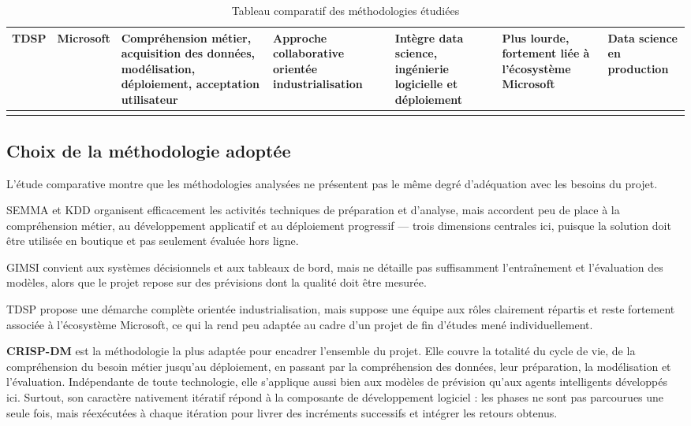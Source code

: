 \begin{longtable}{|P{1.45cm}|P{1.80cm}|P{2.45cm}|P{2.60cm}|P{2.00cm}|P{1.85cm}|P{1.70cm}|}
\hline

\textbf{TDSP} &
Microsoft &
Compréhension métier, acquisition des données, modélisation, déploiement, acceptation utilisateur &
Approche collaborative orientée industrialisation &
Intègre data science, ingénierie logicielle et déploiement &
Plus lourde, fortement liée à l'écosystème Microsoft &
Data science en production \\

\hline

\caption{Tableau comparatif des méthodologies étudiées}
\label{tab:comparaison-methodologies-chap1}

\end{longtable}
\endgroup

\subsection{Choix de la méthodologie adoptée}

L'étude comparative montre que les méthodologies analysées ne présentent pas le même degré d'adéquation avec les besoins du projet.

SEMMA et KDD organisent efficacement les activités techniques de préparation et d'analyse, mais accordent peu de place à la compréhension métier, au développement applicatif et au déploiement progressif — trois dimensions centrales ici, puisque la solution doit être utilisée en boutique et pas seulement évaluée hors ligne.

GIMSI convient aux systèmes décisionnels et aux tableaux de bord, mais ne détaille pas suffisamment l'entraînement et l'évaluation des modèles, alors que le projet repose sur des prévisions dont la qualité doit être mesurée.

TDSP propose une démarche complète orientée industrialisation, mais suppose une équipe aux rôles clairement répartis et reste fortement associée à l'écosystème Microsoft, ce qui la rend peu adaptée au cadre d'un projet de fin d'études mené individuellement.

\textbf{CRISP-DM} est la méthodologie la plus adaptée pour encadrer l'ensemble du projet. Elle couvre la totalité du cycle de vie, de la compréhension du besoin métier jusqu'au déploiement, en passant par la compréhension des données, leur préparation, la modélisation et l'évaluation. Indépendante de toute technologie, elle s'applique aussi bien aux modèles de prévision qu'aux agents intelligents développés ici. Surtout, son caractère nativement itératif répond à la composante de développement logiciel : les phases ne sont pas parcourues une seule fois, mais réexécutées à chaque itération pour livrer des incréments successifs et intégrer les retours obtenus.

